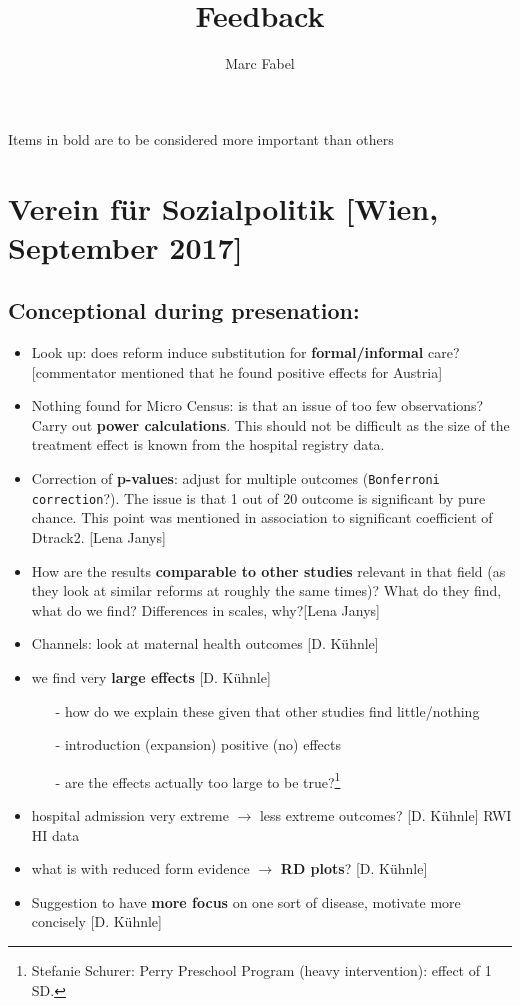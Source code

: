 \documentclass[10pt,a4paper]{article}
\author{Marc Fabel}\date{\flushleft{Letzte Bearbeitung des Dokuments: \today}}
\title{Feedback}
\begin{document}
\maketitle

Items in bold are to be considered more important than others
\bigskip
\section{Verein für Sozialpolitik [Wien, September 2017]}
\subsection{Conceptional during presenation:}
\begin{itemize}
	\item Look up: does reform induce substitution for \textbf{formal/informal} care? [commentator mentioned that he found positive effects for Austria] 
	\item Nothing found for Micro Census: is that an issue of too few observations? Carry out \textbf{power calculations}. This should not be difficult as the size of the treatment effect is known from the hospital registry data.
	\item Correction of \textbf{p-values}: adjust for multiple outcomes (\texttt{Bonferroni correction}?). The issue is that 1 out of 20 outcome is significant by pure chance. This point was mentioned in association to significant coefficient of Dtrack2. [Lena Janys]
	\item How are the results \textbf{comparable to other studies} relevant in that field (as they look at similar reforms at roughly the same times)? What do they find, what do we find? Differences in scales, why?[Lena Janys]
	\item Channels: look at maternal health outcomes [D. Kühnle]
	\item we find very \textbf{large effects} [D. Kühnle]
\begin{itemize}
\item[-]how do we explain these given that other studies find little/nothing  
\item[-] introduction (expansion) positive (no) effects
\item[-] are the effects actually too large to be true?\footnote{Stefanie Schurer: Perry Preschool Program (heavy intervention): effect of 1 SD.}
\end{itemize}	
	\item hospital admission very extreme $\rightarrow$ less extreme outcomes? [D. Kühnle] RWI HI data
	\item what is with reduced form evidence $\rightarrow$ \textbf{RD plots}? [D. Kühnle]
	\item Suggestion to have \textbf{more focus} on one sort of disease, motivate more concisely [D. Kühnle]
\end{itemize}
\end{document}
